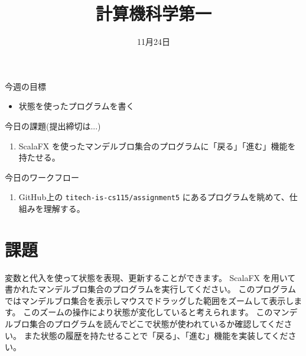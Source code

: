 \documentclass[a4paper,twoside,onecolumn,openany,article]{memoir}
\title{計算機科学第一}
\date{11月24日}
\begin{document}
\maketitle

\noindent
今週の目標
\begin{itemize}
\item 状態を使ったプログラムを書く
\end{itemize}

\noindent
今日の課題(提出締切は...)
\begin{enumerate}
\item 
ScalaFX を使ったマンデルブロ集合のプログラムに「戻る」「進む」機能を持たせる。
\end{enumerate}

\noindent
今日のワークフロー
\begin{enumerate}
\item GitHub上の \verb|titech-is-cs115/assignment5| にあるプログラムを眺めて、仕組みを理解する。
\end{enumerate}

\section{課題}
変数と代入を使って状態を表現、更新することができます。
ScalaFX を用いて書かれたマンデルブロ集合のプログラムを実行してください。
このプログラムではマンデルブロ集合を表示しマウスでドラッグした範囲をズームして表示します。
このズームの操作により状態が変化していると考えられます。
このマンデルブロ集合のプログラムを読んでどこで状態が使われているか確認してください。
また状態の履歴を持たせることで「戻る」、「進む」機能を実装してください。
\end{document}
